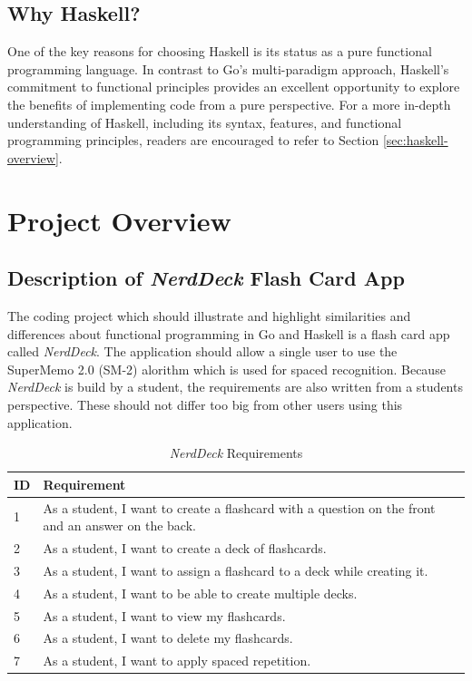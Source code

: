 \section{Why Haskell?}\label{sec:whyhaskell}
One of the key reasons for choosing Haskell is its status as a pure functional programming language. In contrast to Go's multi-paradigm approach, Haskell's commitment to functional principles provides an excellent opportunity to explore the benefits of implementing code from a pure perspective.
For a more in-depth understanding of Haskell, including its syntax, features, and functional programming principles, readers are encouraged to refer to Section \ref{sec:haskell-overview}.

\chapter{Project Overview}\label{chap:project-overview}
    \section{Description of \textit{NerdDeck} Flash Card App}\label{sec:description}
The coding project which should illustrate and highlight similarities and differences about functional programming in Go and Haskell is a flash card app called \textit{NerdDeck}. The application should allow a single user to use the SuperMemo 2.0 (SM-2) alorithm which is used for spaced recognition.\cite{sm2} Because \textit{NerdDeck} is build by a student, the requirements are also written from a students perspective. These should not differ too big from other users using this application.

\begin{table}[h]
    \centering
    \begin{tabular}{|m{0.5in}|m{4in}|}
        \hline
        \textbf{ID} & \textbf{Requirement} \\
        \hline
        1 & As a student, I want to create a flashcard with a question on the front and an answer on the back. \\
        \hline
        2 & As a student, I want to create a deck of flashcards. \\
        \hline
        3 & As a student, I want to assign a flashcard to a deck while creating it. \\
        \hline
        4 & As a student, I want to be able to create multiple decks. \\
        \hline
        5 & As a student, I want to view my flashcards. \\
        \hline
        6 & As a student, I want to delete my flashcards. \\
        \hline
        7 & As a student, I want to apply spaced repetition. \\
        \hline
    \end{tabular}
    \caption{\textit{NerdDeck} Requirements}
    \label{tab:requirements}
\end{table}

